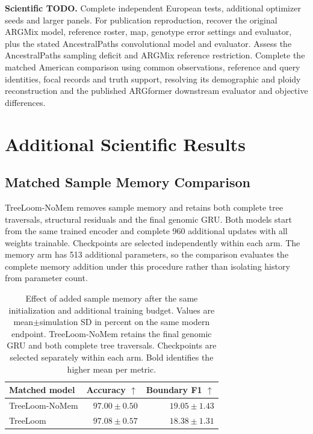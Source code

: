 \documentclass[letterpaper]{article}
\newcommand{\best}[1]{\mathbf{#1}}
\newcommand{\todo}[1]{\par\noindent\textbf{Scientific TODO.} #1\par}
\begin{document}
\todo{Complete independent European tests, additional optimizer seeds and larger panels. For publication reproduction, recover the original ARGMix model, reference roster, map, genotype error settings and evaluator, plus the stated AncestralPaths convolutional model and evaluator. Assess the AncestralPaths sampling deficit and ARGMix reference restriction. Complete the matched American comparison using common observations, reference and query identities, focal records and truth support, resolving its demographic and ploidy reconstruction and the published ARGformer downstream evaluator and objective differences.}



\section{Additional Scientific Results}
\subsection{Matched Sample Memory Comparison}
TreeLoom-NoMem removes sample memory and retains both complete tree traversals, structural residuals and the final genomic GRU. Both models start from the same trained encoder and complete 960 additional updates with all weights trainable. Checkpoints are selected independently within each arm. The memory arm has 513 additional parameters, so the comparison evaluates the complete memory addition under this procedure rather than isolating history from parameter count.

\begin{table}[t]
\centering
\small
\begin{tabular}{@{}lrr@{}}
\toprule
Matched model & Accuracy $\uparrow$ & Boundary F1 $\uparrow$\\
\midrule
TreeLoom-NoMem &$97.00\pm0.50$&$\best{19.05\pm1.43}$\\
TreeLoom &$\best{97.08\pm0.57}$&$18.38\pm1.31$\\
\bottomrule
\end{tabular}
\caption{Effect of added sample memory after the same initialization and additional training budget. Values are mean$\pm$simulation SD in percent on the same modern endpoint. TreeLoom-NoMem retains the final genomic GRU and both complete tree traversals. Checkpoints are selected separately within each arm. Bold identifies the higher mean per metric.}
\label{tab:memory}
\end{table}
\end{document}
